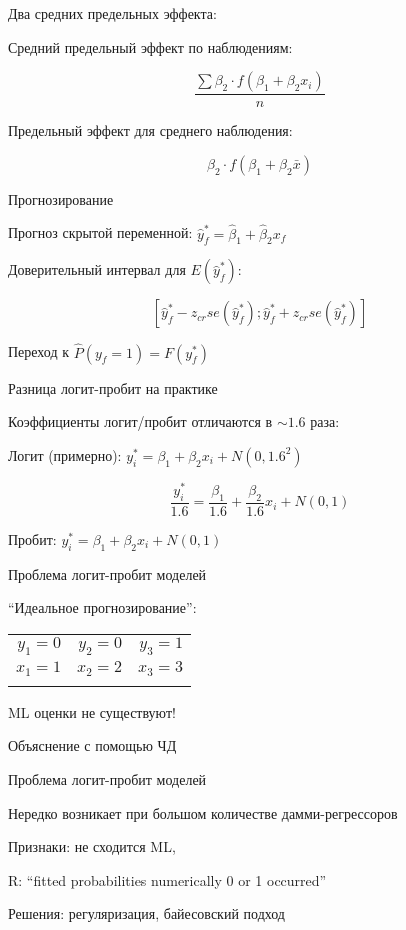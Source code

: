 \documentclass[ignorenonframetext,]{beamer}
\begin{document}
\begin{frame}{Два средних предельных эффекта:}

Средний предельный эффект по наблюдениям:

\[
\frac{\sum \beta_2 \cdot f(\beta_1+\beta_2 x_i)}{n}
\]

Предельный эффект для среднего наблюдения:

\[
\beta_2 \cdot f(\beta_1+\beta_2 \bar{x})
\]

\end{frame}

\begin{frame}{Прогнозирование}

Прогноз скрытой переменной:
$\hat{y}^*_f=\hat{\beta}_1+\hat{\beta}_2 x_f$

Доверительный интервал для $E(\hat{y}^*_f)$:

\[
[\hat{y}^*_f-z_{cr}se(\hat{y}^*_f);\hat{y}^*_f+z_{cr}se(\hat{y}^*_f)]
\]

Переход к $\hat{P}(y_f=1)=F(y^*_f)$

\end{frame}

\begin{frame}{Разница логит-пробит на практике}

Коэффициенты логит/пробит отличаются в $\sim 1.6$ раза:

Логит (примерно): $y^*_i=\beta_1+\beta_2 x_i +N(0,1.6^2)$

\[
\frac{y^*_i}{1.6}=\frac{\beta_1}{1.6}+\frac{\beta_2}{1.6} x_i +N(0,1)
\]

Пробит: $y^*_i=\beta_1+\beta_2 x_i +N(0,1)$

\end{frame}

\begin{frame}{Проблема логит-пробит моделей}

``Идеальное прогнозирование'':

\begin{longtable}[c]{@{}rrr@{}}
\toprule\addlinespace
$y_1=0$ & $y_2=0$ & $y_3=1$
\\\addlinespace
\midrule\endhead
$x_1=1$ & $x_2=2$ & $x_3=3$
\\\addlinespace
\bottomrule
\end{longtable}

ML оценки не существуют!

\end{frame}

\begin{frame}{Объяснение с помощью ЧД}

\end{frame}

\begin{frame}{Проблема логит-пробит моделей}

Нередко возникает при большом количестве дамми-регрессоров

Признаки: не сходится ML,

R: ``fitted probabilities numerically 0 or 1 occurred''

Решения: регуляризация, байесовский подход

\end{frame}
\end{document}
